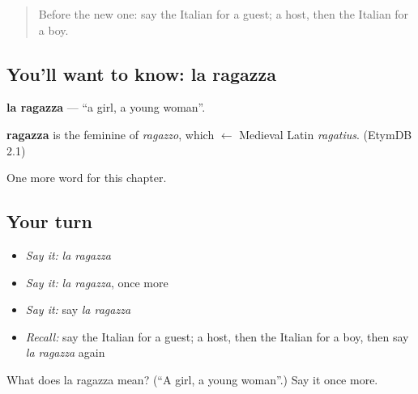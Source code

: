 \begin{quote}
Before the new one: say the Italian for a guest; a host, then the Italian for a boy.
\end{quote}

\subsection*{You'll want to know: la ragazza}
\textbf{la ragazza} — \textquotedblleft{}a girl, a young woman\textquotedblright{}.

\begin{cousinweb}
\textbf{ragazza} is the feminine of \emph{ragazzo}, which $\leftarrow$ Medieval Latin \emph{ragatius}. (EtymDB 2.1)
\end{cousinweb}

\begin{grammarlens}[title={What you've built}]
One more word for this chapter.
\end{grammarlens}

\subsection*{Your turn}
\begin{itemize}
\raggedright
  \item \emph{Say it:} \emph{la ragazza}
  \item \emph{Say it:} \emph{la ragazza}, once more
  \item \emph{Say it:} say \emph{la ragazza}
  \item \emph{Recall:} say the Italian for a guest; a host, then the Italian for a boy, then say \emph{la ragazza} again
\end{itemize}

\begin{tcolorbox}[breakable,colback=teal!4,colframe=teal!35!black,title={Before you move on}]
What does la ragazza mean? (\textquotedblleft{}A girl, a young woman\textquotedblright{}.) Say it once more.
\end{tcolorbox}
